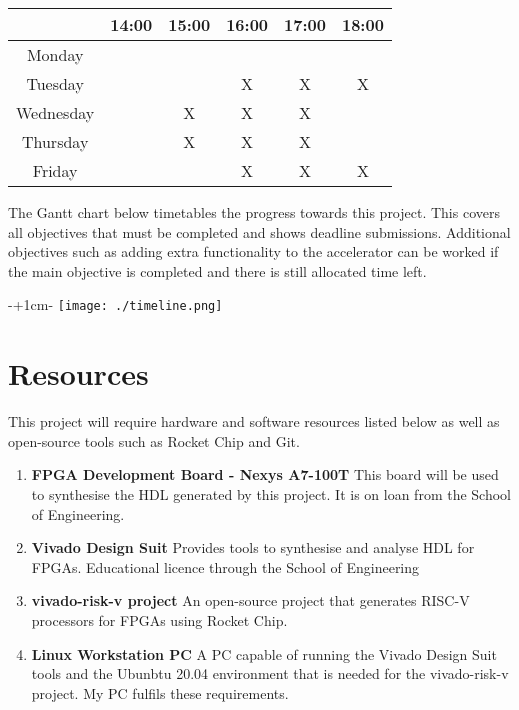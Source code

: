 \documentclass[a4paper,fleqn,12pt]{article}
\begin{document}
	\begin{table}[h]
		\centering
		\begin{tabular}{c|c|c|c|c|c|}
			\cline{2-6}
			& 14:00 & 15:00 & 16:00 & 17:00 & 18:00 \\ \hline
			\multicolumn{1}{|c|}{Monday}    &       &       &       &       &       \\ \hline
			\multicolumn{1}{|c|}{Tuesday}   &       &       & X     & X     & X     \\ \hline
			\multicolumn{1}{|c|}{Wednesday} &       & X     & X     & X     &       \\ \hline
			\multicolumn{1}{|c|}{Thursday}  &       & X     & X     & X     &       \\ \hline
			\multicolumn{1}{|c|}{Friday}    &       &       & X     & X     & X     \\ \hline
		\end{tabular}
	\end{table}

	The Gantt chart below timetables the progress towards this project. This covers all objectives that must be completed and shows deadline submissions. Additional objectives such as adding extra functionality to the accelerator can be worked if the main objective is completed and there is still allocated time left.
	
	\begin{adjustwidth}{-\oddsidemargin-1in+1cm}{-\rightmargin}
		\centering
		\texttt{[image: ./timeline.png]}
	\end{adjustwidth}
	
	\section{Resources}
	This project will require hardware and software resources listed below as well as open-source tools such as Rocket Chip and Git.
	\begin{enumerate}
		\item \textbf{FPGA Development Board - Nexys A7-100T} \newline
		This board will be used to synthesise the HDL generated by this project. It is on loan from the School of Engineering.
		\item \textbf{Vivado Design Suit} \newline
		Provides tools to synthesise and analyse HDL for FPGAs. Educational licence through the School of Engineering
		\item \textbf{vivado-risk-v project} \citep{vivado-risk-v} \newline
		An open-source project that generates RISC-V processors for FPGAs using Rocket Chip.
		\item \textbf{Linux Workstation PC} \newline
		A PC capable of running the Vivado Design Suit tools and the Ubunbtu 20.04 environment that is needed for the vivado-risk-v project. My PC fulfils these requirements.
	\end{enumerate}
	
\end{document}
